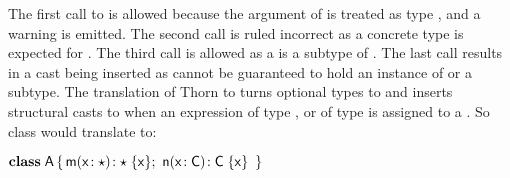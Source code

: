 \documentclass[acmlarge, anonymous, authordraft]{acmart}
\begin{document}
\medskip
%
%

\noindent The first call to \m is allowed because the argument of \m
is treated as type \any, and a warning is emitted. The second call is ruled
incorrect as a concrete type is expected for \n. The third call is allowed
as a \C is a subtype of \dt\C. The last call results in a cast being
inserted as \dt\C cannot be guaranteed to hold an instance of \C or a
subtype.  The translation of Thorn to \kafka turns optional types to \any and
inserts structural casts to \C when an expression of type \any, or of type
\dt\C is assigned to a \C. So class \A would translate to:

\medskip
\(
 \Class \A {
    \Mdef \m\x\any \any  \x  ; \ 
    \Mdef \n\x\C\C  \x 
    }
\)

\medskip
\end{document}
